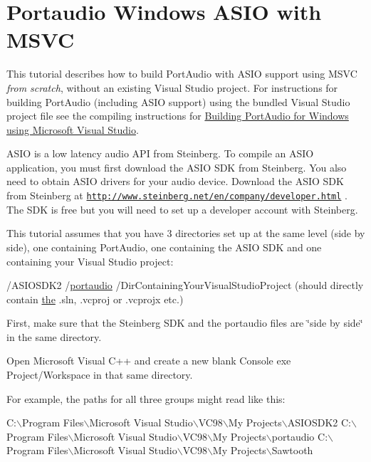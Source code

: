 \hypertarget{compile_windows_asio_msvc_comp_win_asiomsvc1}{}\section{Portaudio Windows A\+S\+I\+O with M\+S\+VC}\label{compile_windows_asio_msvc_comp_win_asiomsvc1}
This tutorial describes how to build Port\+Audio with A\+S\+IO support using M\+S\+VC {\itshape from scratch}, without an existing Visual Studio project. For instructions for building Port\+Audio (including A\+S\+IO support) using the bundled Visual Studio project file see the compiling instructions for \hyperlink{compile_windows}{Building Port\+Audio for Windows using Microsoft Visual Studio}.

A\+S\+IO is a low latency audio A\+PI from Steinberg. To compile an A\+S\+IO application, you must first download the A\+S\+IO S\+DK from Steinberg. You also need to obtain A\+S\+IO drivers for your audio device. Download the A\+S\+IO S\+DK from Steinberg at \href{http://www.steinberg.net/en/company/developer.html}{\tt http\+://www.\+steinberg.\+net/en/company/developer.\+html} . The S\+DK is free but you will need to set up a developer account with Steinberg.

This tutorial assumes that you have 3 directories set up at the same level (side by side), one containing Port\+Audio, one containing the A\+S\+IO S\+DK and one containing your Visual Studio project\+:


\begin{DoxyCode}
/ASIOSDK2 
/\hyperlink{namespaceportaudio}{portaudio}
/DirContainingYourVisualStudioProject  (should directly contain \hyperlink{nasm_8h_aaf57ffcfef0bee04f46c6ada2a905a8c}{the} .sln, .vcproj or .vcprojx etc.)
\end{DoxyCode}


First, make sure that the Steinberg S\+DK and the portaudio files are \char`\"{}side by side\char`\"{} in the same directory.

Open Microsoft Visual C++ and create a new blank Console exe Project/\+Workspace in that same directory.

For example, the paths for all three groups might read like this\+:


\begin{DoxyCode}
C:\(\backslash\)Program Files\(\backslash\)Microsoft Visual Studio\(\backslash\)VC98\(\backslash\)My Projects\(\backslash\)ASIOSDK2
C:\(\backslash\)Program Files\(\backslash\)Microsoft Visual Studio\(\backslash\)VC98\(\backslash\)My Projects\(\backslash\)portaudio
C:\(\backslash\)Program Files\(\backslash\)Microsoft Visual Studio\(\backslash\)VC98\(\backslash\)My Projects\(\backslash\)Sawtooth
\end{DoxyCode}


